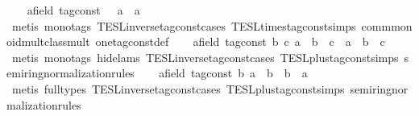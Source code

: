 \begin{isabellebody}
\ \ \isamarkupfalse%
\ {\isacartoucheopen}{\isasymAnd}{\isacharparenleft}a{\isacharcolon}{\isacharcolon}{\isacharparenleft}{\isacharprime}{\isasymtau}{\isacharcolon}{\isacharcolon}field\ tag{\isacharunderscore}const{\isacharparenright}{\isacharparenright}{\isachardot}\ {}\ {\isacharasterisk}\ a\ {\isacharequal}\ a{\isacartoucheclose}\isanewline
\ \ \ \ \isamarkupfalse%
\ {\isacharparenleft}metis\ {\isacharparenleft}mono{\isacharunderscore}tags{\isacharparenright}\ TESL{\isachardot}inverse{\isacharunderscore}tag{\isacharunderscore}const{\isachardot}cases\ TESL{\isachardot}times{\isacharunderscore}tag{\isacharunderscore}const{\isachardot}simps\ comm{\isacharunderscore}monoid{\isacharunderscore}mult{\isacharunderscore}class{\isachardot}mult{\isacharunderscore}{}\ one{\isacharunderscore}tag{\isacharunderscore}const{\isacharunderscore}def{\isacharparenright}\isanewline
\ \ \isamarkupfalse%
\ {\isacartoucheopen}{\isasymAnd}{\isacharparenleft}a{\isacharcolon}{\isacharcolon}{\isacharparenleft}{\isacharprime}{\isasymtau}{\isacharcolon}{\isacharcolon}field\ tag{\isacharunderscore}const{\isacharparenright}{\isacharparenright}\ b\ c{\isachardot}\ a\ {\isacharplus}\ b\ {\isacharplus}\ c\ {\isacharequal}\ a\ {\isacharplus}\ {\isacharparenleft}b\ {\isacharplus}\ c{\isacharparenright}{\isacartoucheclose}\isanewline
\ \ \ \ \isamarkupfalse%
\ {\isacharparenleft}metis\ {\isacharparenleft}mono{\isacharunderscore}tags{\isacharcomma}\ hide{\isacharunderscore}lams{\isacharparenright}\ TESL{\isachardot}inverse{\isacharunderscore}tag{\isacharunderscore}const{\isachardot}cases\ TESL{\isachardot}plus{\isacharunderscore}tag{\isacharunderscore}const{\isachardot}simps\ semiring{\isacharunderscore}normalization{\isacharunderscore}rules{\isacharparenleft}{}{}{\isacharparenright}{\isacharparenright}\isanewline
\ \ \isamarkupfalse%
\ {\isacartoucheopen}{\isasymAnd}{\isacharparenleft}a{\isacharcolon}{\isacharcolon}{\isacharparenleft}{\isacharprime}{\isasymtau}{\isacharcolon}{\isacharcolon}field\ tag{\isacharunderscore}const{\isacharparenright}{\isacharparenright}\ b{\isachardot}\ a\ {\isacharplus}\ b\ {\isacharequal}\ b\ {\isacharplus}\ a{\isacartoucheclose}\isanewline
\ \ \ \ \isamarkupfalse%
\ {\isacharparenleft}metis\ {\isacharparenleft}full{\isacharunderscore}types{\isacharparenright}\ TESL{\isachardot}inverse{\isacharunderscore}tag{\isacharunderscore}const{\isachardot}cases\ TESL{\isachardot}plus{\isacharunderscore}tag{\isacharunderscore}const{\isachardot}simps\ semiring{\isacharunderscore}normalization{\isacharunderscore}rules{\isacharparenleft}{}{}{\isacharparenright}{\isacharparenright}\isanewline

\end{isabellebody}
